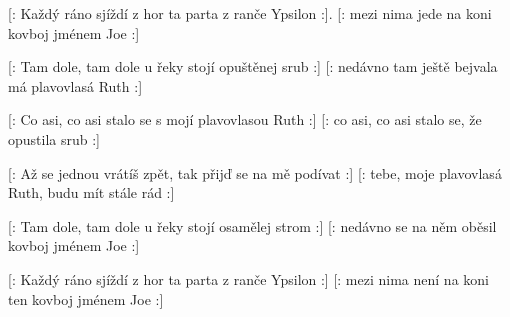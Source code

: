 
\beginverse{}
[: Každý ráno sjíždí z hor ta parta z ranče Ypsilon :].
[: mezi nima jede na koni kovboj jménem Joe :]
\endverse{}

\beginverse{}
[: Tam dole, tam dole u řeky stojí opuštěnej srub :]
[: nedávno tam ještě bejvala má plavovlasá Ruth :]
\endverse{}

\beginverse{}
[: Co asi, co asi stalo se s mojí plavovlasou Ruth :]
[: co asi, co asi stalo se, že opustila srub :]
\endverse{}

\beginverse{}
[: Až se jednou vrátíš zpět, tak přijď se na mě podívat :]
[: tebe, moje plavovlasá Ruth, budu mít stále rád :]
\endverse{}

\beginverse{}
[: Tam dole, tam dole u řeky stojí osamělej strom :]
[: nedávno se na něm oběsil kovboj jménem Joe :]
\endverse{}

\beginverse{}
[: Každý ráno sjíždí z hor ta parta z ranče Ypsilon :]
[: mezi nima není na koni ten kovboj jménem Joe :]
\endverse{}

\endsong{}

